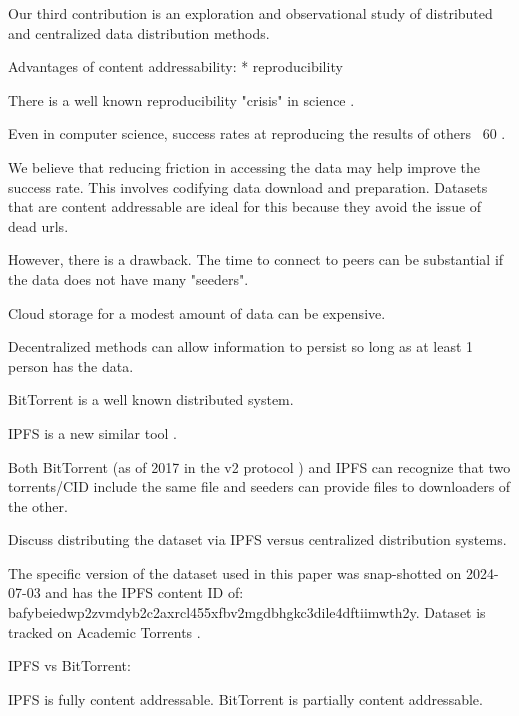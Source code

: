 \documentclass[10pt,twocolumn,letterpaper]{article}
\begin{document}

Our third contribution is an exploration and observational study of distributed
and centralized data distribution methods. 

Advantages of content addressability:
* reproducibility 

There is a well known reproducibility "crisis" in science \cite{baker_reproducibility_2016}.

Even in computer science, success rates at reproducing the results of others ~60%
\cite{NEURIPS2019_c429429b, collberg2016repeatability, desai_what_2024}.

We believe that reducing friction in accessing the data may help improve the
success rate. This involves codifying data download and preparation. Datasets
that are content addressable are ideal for this because they avoid the issue of
dead urls.

However, there is a drawback. The time to connect to peers can be substantial
if the data does not have many "seeders". 


Cloud storage for a modest amount of data can be expensive.

Decentralized methods can allow information to persist so long as at least 1
person has the data.

BitTorrent is a well known distributed system.

IPFS is a new similar tool \cite{benet_ipfs_2014,bieri_overview_2021}.


Both BitTorrent (as of 2017 in the v2 protocol \cite{cohen_bittorrent_2017})
and IPFS can recognize that two torrents/CID include the same file and seeders
can provide files to downloaders of the other.

Discuss distributing the dataset via IPFS versus centralized distribution
systems.


The specific version of the dataset used in this paper was snap-shotted on
2024-07-03 and has the IPFS content ID of:
bafybeiedwp2zvmdyb2c2axrcl455xfbv2mgdbhgkc3dile4dftiimwth2y.
Dataset is tracked on Academic Torrents \cite{academic_torrents_Cohen2014}.


IPFS vs BitTorrent:

IPFS is fully content addressable.
BitTorrent is partially content addressable.
\end{document}
